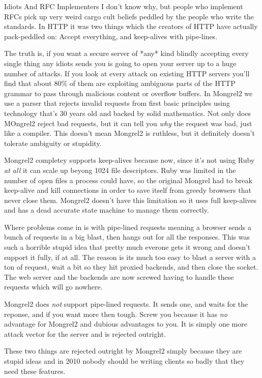 \begin{aside}{Idiots And RFC Implementers}
I don't know why, but people who implement RFCs pick up very weird cargo cult
beliefs peddled by the people who write the standards.  In HTTP it was two things
which the creators of HTTP have actually pack-peddled on:  Accept everything, and 
keep-alives with pipe-lines.

The truth is, if you want a secure server of *any* kind blindly accepting every 
single thing any idiots sends you is going to open your server up to a huge number
of attacks.  If you look at every attack on existing HTTP servers you'll find that 
about 80\% of them are exploiting ambiguous parts of the HTTP grammar to pass
through malicious content or overflow buffers.  In Mongrel2 we use a parser that rejects
invalid requests from first basic principles using technology that's 30 years old and
backed by solid mathematics.  Not only does MOngrel2 reject bad requests, but it can
tell you \emph{why} the request was bad, just like a compiler.  This doesn't mean
Mongrel2 is ruthless, but it definitely doesn't tolerate ambiguity or stupidity.

Mongrel2 completey supports keep-alives because now, since it's not using Ruby 
\emph{at all} it can scale up beyong 1024 file descriptors.  Ruby was limited
in the number of open files a process could have, so the original Mongrel had
to break keep-alive and kill connections in order to save itself from greedy
browsers that never close them.  Mongrel2 doesn't have this limitation so it
uses full keep-alives and has a dead accurate state machine to manage them correctly.

Where problems come in is with pipe-lined requests meaning a browser sends a bunch
of requests in a big blast, then hangs out for all the responses.  This was such a
horrible stupid idea that pretty much everone gets it wrong and doesn't support it
fully, if at all.  The reason is its much too easy to blast a server with a ton
of request, wait a bit so they hit proxied backends, and then close the socket.  The
web server and the backends are now screwed having to handle these requests which will
go nowhere.

Mongrel2 does \emph{not} support pipe-lined requests.  It sends one, and waits for the
reponse, and if you want more then tough.  Screw you because it has \emph{no} advantage
for Mongrel2 and dubious advantages to you.  It is simply one more attack vector for
the server and is rejected outright.

These two things are rejected outright by Mongrel2 simply because they are stupid ideas
and in 2010 nobody should be writing clients so badly that they need these features.
\end{aside}

